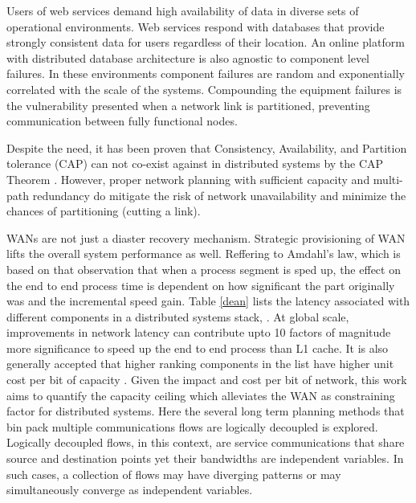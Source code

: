\documentclass[conference]{IEEEtran}
\begin{document}
Users of web services demand high availability of data in diverse sets of operational environments. Web services respond with databases that provide strongly consistent data for users regardless of their location. An online platform with distributed database architecture is also agnostic to component level failures. In these environments component failures are random and exponentially correlated with the scale of the systems. Compounding the equipment failures is the vulnerability presented when a network link is partitioned, preventing communication between fully functional nodes. 

Despite the need, it has been proven that Consistency, Availability, and Partition tolerance (CAP) can not co-exist against in distributed systems by the CAP Theorem \cite{CAP}. However, proper network planning with sufficient capacity and multi-path redundancy do mitigate the risk of network unavailability and minimize the chances of partitioning (cutting a link).

WANs are not just a diaster recovery mechanism. Strategic provisioning of WAN lifts the overall system performance as well. Reffering to Amdahl's law, which is based on that observation that when a process segment is sped up, the effect on the end to end process time is dependent on how significant the part originally was and the incremental speed gain. Table \ref{dean} lists the latency associated with different components in a distributed systems stack, \cite{Dean}. At global scale, improvements in network latency can contribute upto 10 factors of magnitude more significance to speed up the end to end process than L1 cache. It is also generally accepted that higher ranking components in the list have higher unit cost per bit of capacity \cite{Bryant}. Given the impact and cost per bit of network, this work aims to quantify the capacity ceiling which alleviates the WAN as constraining factor for distributed systems. Here the several long term planning methods that bin pack multiple communications flows are logically decoupled is explored. Logically decoupled flows, in this context, are service communications that share source and destination points yet their bandwidths are independent variables. In such cases, a collection of flows may have diverging patterns or may simultaneously converge as independent variables.
 
\end{document}
